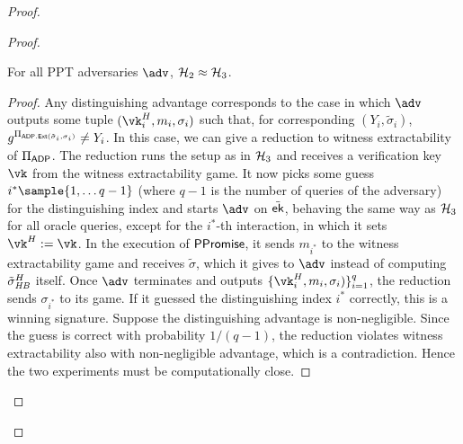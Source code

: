 \begin{proof}
\begin{proof}
        \begin{claim}
        For all PPT adversaries $\adv$, $\mathcal{H}_2 \approx \mathcal{H}_3$.
        \end{claim}
        \begin{proof}
        Any distinguishing advantage corresponds to the case in which $\adv$ outputs some tuple $(\vk_i^H,m_i,\sigma_i)$ such that, for corresponding $(Y_i,\tilde\sigma_i)$, $g^{\Pi_{\mathsf{ADP}.{\mathsf{Ext}}(\tilde\sigma_i,\sigma_i)}} \neq Y_i$. In this case, we can give a reduction to witness extractability of $\Pi_{\mathsf{ADP}}$. The reduction runs the setup as in $\mathcal{H}_3$ and receives a verification key $\vk$ from the witness extractability  game. It now picks some guess $i^* \sample \{1, \dots q-1\}$ (where $q-1$ is the number of queries of the adversary) for the distinguishing index and starts $\adv$ on $\tilde{\mathsf{ek}}$, behaving the same way as $\mathcal{H}_3$ for all oracle queries, except for the $i^*$-th interaction, in which it sets $\vk^H := \vk$. In the execution of $\mathsf{PPromise}$, it sends $m_{i^*}$ to the witness extractability game and receives $\tilde\sigma$, which it gives to $\adv$ instead of computing $\tilde\sigma_{\mathit{HB}}^H$ itself. Once $\adv$ terminates and outputs $\{\vk_i^H,m_i,\sigma_i)\}_{i=1}^{q}$, the reduction sends $\sigma_{i^*}$ to its game. If it guessed the distinguishing index $i^*$ correctly, this is a winning signature. Suppose the distinguishing advantage is non-negligible. Since the guess is correct with probability $1/(q-1)$, the reduction violates witness extractability also with non-negligible advantage, which is a contradiction. Hence the two experiments must be computationally close.
        \end{proof}
        
        

\end{proof}
\end{proof}
